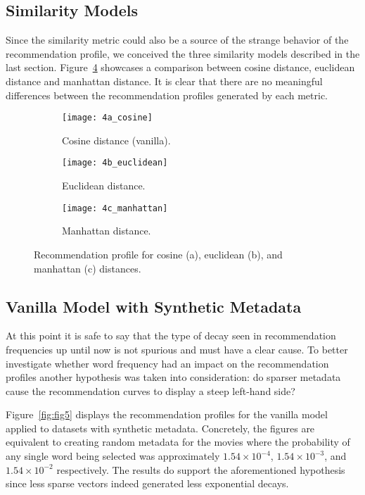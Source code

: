 \subsection{Similarity Models}
\label{subsec:similarity}

Since the similarity metric could also be a source of the strange behavior of
the recommendation profile, we conceived the three similarity models described
in the last section. Figure~\ref{fig:fig4} showcases a comparison between cosine
distance, euclidean distance and manhattan distance. It is clear that there are
no meaningful differences between the recommendation profiles generated by each
metric.

\begin{figure}
  \centering
  \begin{subfigure}{0.3\textwidth}
    \centering
    \texttt{[image: 4a\_cosine]}
    \caption{Cosine distance (vanilla).\label{fig:fig4a}}
  \end{subfigure}
  \begin{subfigure}{0.3\textwidth}
    \centering
    \texttt{[image: 4b\_euclidean]}
    \caption{Euclidean distance.\label{fig:fig4b}}
  \end{subfigure}
  \begin{subfigure}{0.3\textwidth}
    \centering
    \texttt{[image: 4c\_manhattan]}
    \caption{Manhattan distance.\label{fig:fig4c}}
  \end{subfigure}
  \caption{Recommendation profile for cosine (a), euclidean (b), and manhattan
    (c) distances.\label{fig:fig4}}
\end{figure}

\subsection{Vanilla Model with Synthetic Metadata}
\label{subsec:synthetic}

At this point it is safe to say that the type of decay seen in recommendation
frequencies up until now is not spurious and must have a clear cause. To better
investigate whether word frequency had an impact on the recommendation profiles
another hypothesis was taken into consideration: do sparser metadata cause the
recommendation curves to display a steep left-hand side?

Figure~\ref{fig:fig5} displays the recommendation profiles for the vanilla model
applied to datasets with synthetic metadata. Concretely, the figures are
equivalent to creating random metadata for the movies where the probability of
any single word being selected was approximately $1.54 \times 10^{-4}$, $1.54
\times 10^{-3}$, and $1.54 \times 10^{-2}$ respectively. The results do support
the aforementioned hypothesis since less sparse vectors indeed generated less
exponential decays.

